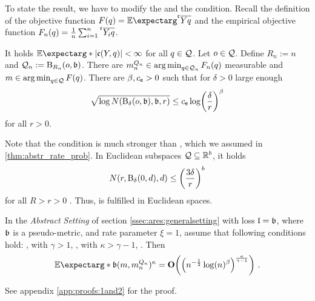 To state the result, we have to modify the  and the  condition.
Recall the definition of the objective function $F(q) = \Ex{\olc Yq}$ and the empirical objective function $F_n(q) = \frac1n \sum_{i=1}^n \olc{Y_i}q$.
\begin{assumptions}
\theoremContentInNewLine
	\begin{enumerate}[label=\environmentEnumerateLabel]
		It holds $\Ex*{\abs{\mf c(Y, q)}} < \infty$ for all $q\in\mathcal{Q}$.
		Let $o\in\mathcal{Q}$. Define $R_n := n$ and $\mathcal{Q}_n := \operatorname{\mathrm{B}}_{R_n}(o,\mathfrak{b})$.
		There are $m^{Q_n}_n \in \operatorname*{arg\,min}_{q\in \mathcal{Q}_n} F_n(q)$ measurable and $m\in\operatorname*{arg\,min}_{q\in\mathcal{Q}} F(q)$.
		There are $\beta, c_{\mathsf{e}} > 0$ such that for $\delta > 0$ large enough
		\begin{equation*}
			\sqrt{\log N(\operatorname{\mathrm{B}}_\delta(o, \mathfrak{b}), \mathfrak{b}, r)} \leq c_{\mathsf{e}} \log\!\left( \frac{\delta}{r} \right)^\beta
		\end{equation*}
		for all $r > 0$.
		\index[inot]{$\beta$}
	\end{enumerate}
\end{assumptions}
%
Note that the  condition is much stronger than , which we assumed in \autoref{thm:abstr_rate_prob}. In Euclidean subspaces $\mathcal{Q} \subseteq \mathbb{R}^b$, it holds \begin{equation*}
N(r,\operatorname{\mathrm{B}}_{\delta}(0,d),d) \leq \left( \frac{3 \delta}{r} \right)^b
\end{equation*} for all $R>r>0$ \cite[section 4]{pollard90}. Thus,  is fulfilled in Euclidean spaces.
%
\begin{theorem}\label{thm:abstr_weak_strong}
	In the \textit{Abstract Setting} of section \ref{ssec:ares:generalsetting} with loss $\mathfrak{l} = \mathfrak{b}$, where $\mathfrak{b}$ is a pseudo-metric, and rate parameter $\xi=1$, assume that following conditions hold:
	,  with $\gamma>1$, ,  with $\kappa > \gamma-1$, .
	Then
	\begin{equation*}
		\Ex*{\mf b(m, m^{Q_n}_n)^\kappa} = \bigO\brOf{\br{n^{-\frac12} \log(n)^\beta}^{\frac{\kappa}{\gamma-1}}}
		\eqfs
	\end{equation*}
\end{theorem}
%
See appendix \autoref{app:proofs:1and2} for the proof.
%